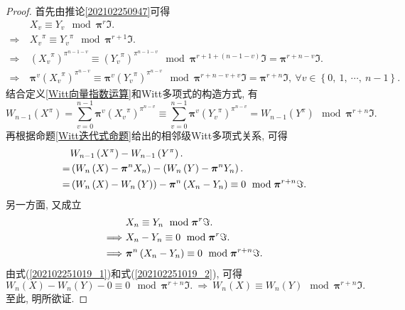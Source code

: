 \documentclass[UTF8, twoside]{ctexart}
\theoremstyle{nonumberplain}
\newtheorem{proof}{\heiti 证明}  %
\theoremstyle{nonumberplain}
\theoremstyle{plain}
\begin{document}
	\begin{proof}
		首先由推论\ref{202102250947}可得
		\begin{align*}
			& {{X}_{v}}\equiv {{Y}_{v}}\ \bmod {\bm{\pi }^{r}}\Im . \\ 
			\Longrightarrow\ & {{X}_{v}}^{\pi }\equiv {{Y}_{v}}^{\pi }\ \bmod {\bm{\pi }^{r+1}}\Im . \\ 
			\Longrightarrow\ & {{\left( {{X}_{v}}^{\pi } \right)}^{{{\pi }^{n-1-v}}}}\equiv {{\left( {{Y}_{v}}^{\pi } \right)}^{{{\pi }^{n-1-v}}}}\ \bmod {\bm{\pi }^{r+1+\left( n-1-v \right)}}\Im ={\bm{\pi }^{r+n-v}}\Im . \\ 
			\Longrightarrow\ & {\bm{\pi }^{v}}{{\left( {{X}_{v}}^{\pi } \right)}^{{{\pi }^{n-v}}}}\equiv {\bm{\pi }^{v}}{{\left( {{Y}_{v}}^{\pi } \right)}^{{{\pi }^{n-v}}}}\ \bmod {\bm{\pi }^{r+n-v+v}}\Im ={\bm{\pi }^{r+n}}\Im ,\ \forall v\in \left\{ 0,\ 1,\ \cdots ,\ n-1 \right\}.
		\end{align*}
		结合定义\ref{Witt向量指数运算}和Witt多项式的构造方式, 有
		\[
			{{W}_{n-1}}\left( {{X}^{\pi }} \right)=\sum\limits_{v=0}^{n-1}{{\bm{\pi }^{v}}{{\left( {{X}_{v}}^{\pi } \right)}^{{{\pi }^{n-v}}}}}\equiv \sum\limits_{v=0}^{n-1}{{\bm{\pi }^{v}}{{\left( {{Y}_{v}}^{\pi } \right)}^{{{\pi }^{n-v}}}}}={{W}_{n-1}}\left( {{Y}^{\pi }} \right)\ \bmod {\bm{\pi }^{r+n}}\Im .
		\]
		再根据命题\ref{Witt迭代式命题}给出的相邻级Witt多项式关系, 可得
		\begin{align}
			& {{W}_{n-1}}\left( {{X}^{\pi }} \right)-{{W}_{n-1}}\left( {{Y}^{\pi }} \right). \notag\\ 
			=&\left( {{W}_{n}}\left( X \right)-{\bm{\pi }^{n}}{{X}_{n}} \right)-\left( {{W}_{n}}\left( Y \right)-{\bm{\pi }^{n}}{{Y}_{n}} \right).\notag \\ 
			=&\left( {{W}_{n}}\left( X \right)-{{W}_{n}}\left( Y \right) \right)-{\bm{\pi }^{n}}\left( {{X}_{n}}-{{Y}_{n}} \right)\equiv 0
			\ \bmod {\bm{\pi }^{r+n}}\Im . 
			\label{202102251019_1}
		\end{align}
		另一方面, 又成立
		\begin{align}
			& {{X}_{n}}\equiv {{Y}_{n}}\ \bmod {\bm{\pi }^{r}}\Im . \notag\\ 
			\Longrightarrow\ & {{X}_{n}}-{{Y}_{n}}\equiv 0\ \bmod {\bm{\pi }^{r}}\Im .  \notag\\ 
			\Longrightarrow\ & {\bm{\pi }^{n}}\left( {{X}_{n}}-{{Y}_{n}} \right)\equiv 0
			\ \bmod {\bm{\pi }^{r+n}}\Im .
			\label{202102251019_2}
		\end{align}
		由式(\ref{202102251019_1})和式(\ref{202102251019_2}), 可得
		\[
			{{W}_{n}}\left( X \right)-{{W}_{n}}\left( Y \right)-0\equiv 0\ \bmod {\bm{\pi }^{r+n}}\Im .
			\ \Longrightarrow \ 
			{{W}_{n}}\left( X \right)\equiv {{W}_{n}}\left( Y \right)
			\ \bmod {\bm{\pi }^{r+n}}\Im .
		\]
		至此, 明所欲证. 
	\end{proof}
	\vskip 0.5cm
	
\end{document}
